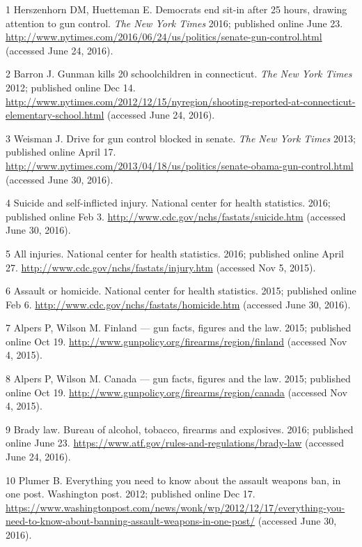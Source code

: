 \documentclass[]{article}
\begin{document}
\hypertarget{refs}{}
\hypertarget{ref-herszenhornux5fdemocratsux5f2016}{}
1 Herszenhorn DM, Huetteman E. Democrats end sit-in after 25 hours,
drawing attention to gun control. \emph{The New York Times} 2016;
published online June 23.
\url{http://www.nytimes.com/2016/06/24/us/politics/senate-gun-control.html}
(accessed June 24, 2016).

\hypertarget{ref-barronux5fgunmanux5f2012}{}
2 Barron J. Gunman kills 20 schoolchildren in connecticut. \emph{The New
York Times} 2012; published online Dec 14.
\url{http://www.nytimes.com/2012/12/15/nyregion/shooting-reported-at-connecticut-elementary-school.html}
(accessed June 24, 2016).

\hypertarget{ref-weismanux5fdriveux5f2013}{}
3 Weisman J. Drive for gun control blocked in senate. \emph{The New York
Times} 2013; published online April 17.
\url{http://www.nytimes.com/2013/04/18/us/politics/senate-obama-gun-control.html}
(accessed June 30, 2016).

\hypertarget{ref-ux5fsuicideux5f2016}{}
4 Suicide and self-inflicted injury. National center for health
statistics. 2016; published online Feb 3.
\url{http://www.cdc.gov/nchs/fastats/suicide.htm} (accessed June 30,
2016).

\hypertarget{ref-ux5fallux5f2016}{}
5 All injuries. National center for health statistics. 2016; published
online April 27. \url{http://www.cdc.gov/nchs/fastats/injury.htm}
(accessed Nov 5, 2015).

\hypertarget{ref-ux5fassaultux5f2015}{}
6 Assault or homicide. National center for health statistics. 2015;
published online Feb 6.
\url{http://www.cdc.gov/nchs/fastats/homicide.htm} (accessed June 30,
2016).

\hypertarget{ref-alpersux5ffinlandux5f2015}{}
7 Alpers P, Wilson M. Finland --- gun facts, figures and the law. 2015;
published online Oct 19.
\url{http://www.gunpolicy.org/firearms/region/finland} (accessed Nov 4,
2015).

\hypertarget{ref-alpersux5fcanadaux5f2015}{}
8 Alpers P, Wilson M. Canada --- gun facts, figures and the law. 2015;
published online Oct 19.
\url{http://www.gunpolicy.org/firearms/region/canada} (accessed Nov 4,
2015).

\hypertarget{ref-ux5fbradyux5f2016}{}
9 Brady law. Bureau of alcohol, tobacco, firearms and explosives. 2016;
published online June 23.
\url{https://www.atf.gov/rules-and-regulations/brady-law} (accessed June
24, 2016).

\hypertarget{ref-plumerux5feverythingux5f2012}{}
10 Plumer B. Everything you need to know about the assault weapons ban,
in one post. Washington post. 2012; published online Dec 17.
\url{https://www.washingtonpost.com/news/wonk/wp/2012/12/17/everything-you-need-to-know-about-banning-assault-weapons-in-one-post/}
(accessed June 30, 2016).
\end{document}
